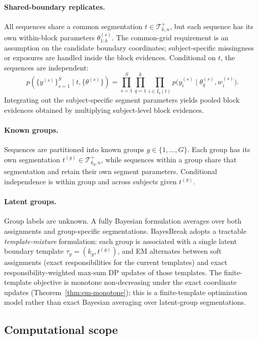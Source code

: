 \paragraph{Shared-boundary replicates.}
All sequences share a common segmentation $t\in\mathcal{T}^{+}_{k,n}$, but each sequence has its
own within-block parameters $\theta^{(s)}_{1:k}$. The common-grid requirement is an assumption on
the candidate boundary coordinates; subject-specific missingness or exposures are handled inside
the block evidences. Conditional on $t$, the sequences are independent:
\begin{equation}
p(\{y^{(s)}\}_{s=1}^S\mid t,\{\theta^{(s)}\})
= \prod_{s=1}^S \prod_{q=1}^k \prod_{i\in I_q(t)} p\bigl(y_i^{(s)}\mid \theta_q^{(s)}, w_i^{(s)}\bigr).
\end{equation}
Integrating out the subject-specific segment parameters yields pooled block evidences obtained by
multiplying subject-level block evidences.

\paragraph{Known groups.}
Sequences are partitioned into known groups $g\in\{1,\dots,G\}$. Each group has its own
segmentation $t^{(g)}\in\mathcal{T}^{+}_{k_g,n}$, while sequences within a group share that
segmentation and retain their own segment parameters. Conditional independence is within group
and across subjects given $t^{(g)}$.

\paragraph{Latent groups.}
Group labels are unknown. A fully Bayesian formulation averages over both
assignments and group-specific segmentations. BayesBreak adopts a tractable
\emph{template-mixture} formulation: each group is associated with a single latent boundary
template $\tau_g=(k_g,t^{(g)})$, and EM alternates between soft assignments (exact responsibilities for the current
templates) and exact responsibility-weighted max-sum DP updates of those templates. The
finite-template objective is monotone non-decreasing under the exact coordinate updates
(Theorem~\ref{thm:em-monotone}); this is a finite-template optimization model rather than exact Bayesian
averaging over latent-group segmentations.

\subsection{Computational scope}
\label{sec:problem-computation}

